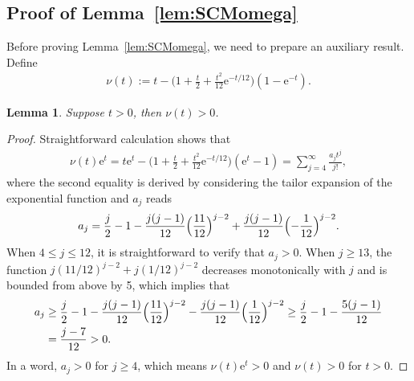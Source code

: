 \documentclass[aop]{imsart}
\theoremstyle{plain}
\newtheorem{lemma}[theorem]{Lemma}
\theoremstyle{remark}
\newcommand{\rme}{\mathrm{e}}
\newcommand{\1}{\operatorname{\uppercase\expandafter{\romannumeral1}}}
\newcommand{\2}{\operatorname{\uppercase\expandafter{\romannumeral2}}}
\newcommand{\3}{\operatorname{\uppercase\expandafter{\romannumeral3}}}
\newcommand{\4}{\operatorname{\uppercase\expandafter{\romannumeral4}}}
\newcommand{\5}{\operatorname{\uppercase\expandafter{\romannumeral5}}}
\newcommand{\6}{\operatorname{\uppercase\expandafter{\romannumeral6}}}
\newcommand{\7}{\operatorname{\uppercase\expandafter{\romannumeral7}}}
\newcommand{\8}{\operatorname{\uppercase\expandafter{\romannumeral8}}}
\newcommand{\9}{\operatorname{\uppercase\expandafter{\romannumeral9}}}
\newcommand{\lref}[1]{Lemma~\ref{#1}}
\begin{document}
\begin{appendix}
\subsection{Proof of \lref{lem:SCMomega}}
Before proving \lref{lem:SCMomega}, we need to prepare an auxiliary result. Define
\begin{align}
\nu(t):=t-\biggl(1+\frac{t}{2}+\frac{t^2}{12}\rme^{-t/12}\biggr)(1-\rme^{-t}). \label{eq:nut}
\end{align}
\begin{lemma}\label{lem:nut}
	Suppose $t>0$, then $\nu(t)>0$. 
\end{lemma}
\begin{proof}
	Straightforward calculation shows that
	\begin{align}
	\nu(t)\rme^t=t\rme^t-\biggl(1+\frac{t}{2}+\frac{t^2}{12}\rme^{-t/12}\biggr)(\rme^{t}-1)
	=\sum_{j=4}^\infty \frac{a_j t^j } {j!},
	\end{align}
	where the second equality is derived by considering the tailor expansion of the exponential function and $a_j$ reads
	\begin{align}
	a_j=\frac{j}{2}-1-\frac{j(j-1)}{12}\Bigl(\frac{11}{12}\Bigr)^{j-2}+\frac{j(j-1)}{12}\Bigl(-\frac{1}{12}\Bigr)^{j-2}. 
	\end{align}
	When $4\leq j\leq 12$, it is straightforward  to verify that $a_j>0$. When $j\geq 13$, the function $j(11/12)^{j-2}+j(1/12)^{j-2}$ decreases monotonically with $j$ and is bounded from above by 5, which implies that
	\begin{align}
	a_j&\geq \frac{j}{2}-1-\frac{j(j-1)}{12}\Bigl(\frac{11}{12}\Bigr)^{j-2}-\frac{j(j-1)}{12}\Bigl(\frac{1}{12}\Bigr)^{j-2}\geq \frac{j}{2}-1-\frac{5(j-1)}{12}\\
	&=\frac{j-7}{12}>0. \nonumber
	\end{align}
	In a word, $a_j>0$ for $j\geq 4$, which means $\nu(t)\rme^t>0$ and $\nu(t)>0$ for $t>0$. 
\end{proof}




\end{appendix}
\end{document}
